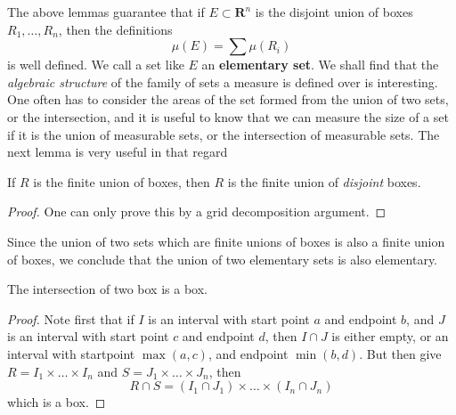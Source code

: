 %


%

The above lemmas guarantee that if $E \subset \mathbf{R}^n$ is the disjoint union of boxes $R_1, \dots, R_n$, then the definitions
%
\[ \mu(E) = \sum \mu(R_i) \]
%
is well defined. We call a set like $E$ an {\bf elementary set}. We shall find that the {\it algebraic structure} of the family of sets a measure is defined over is interesting. One often has to consider the areas of the set formed from the union of two sets, or the intersection, and it is useful to know that we can measure the size of a set if it is the union of measurable sets, or the intersection of measurable sets. The next lemma is very useful in that regard

\begin{lemma}
    If $R$ is the finite union of boxes, then $R$ is the finite union of {\it disjoint} boxes.
\end{lemma}
\begin{proof}
    One can only prove this by a grid decomposition argument.
\end{proof}

Since the union of two sets which are finite unions of boxes is also a finite union of boxes, we conclude that the union of two elementary sets is also elementary.

\begin{lemma}
    The intersection of two box is a box.
\end{lemma}
\begin{proof}
    Note first that if $I$ is an interval with start point $a$ and endpoint $b$, and $J$ is an interval with start point $c$ and endpoint $d$, then $I \cap J$ is either empty, or an interval with startpoint $\max(a,c)$, and endpoint $\min(b,d)$. But then give $R = I_1 \times \dots \times I_n$ and $S = J_1 \times \dots \times J_n$, then
    \[ R \cap S = (I_1 \cap J_1) \times \dots \times (I_n \cap J_n) \]
    which is a box.
\end{proof}

